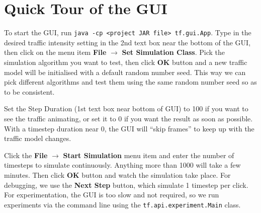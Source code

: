 \section{Quick Tour of the GUI}

To start the GUI, run \verb/java -cp <project JAR file> tf.gui.App/.
Type in the desired traffic intensity setting in the 2nd text box
near the bottom of the GUI, then click on the menu item
\textbf{File} $\rightarrow$ \textbf{Set Simulation Class}. Pick the simulation
algorithm you want to test,
then click \textbf{OK} button and a new traffic model will be
initialised with a default random number seed. This way we can
pick different algorithms and test them using the same random
number seed so as to be consistent.

Set the Step Duration (1st text box near bottom of GUI) to 100
if you want to see the traffic animating, or set it to 0 if
you want the result as soon as possible. With a timestep
duration near 0, the GUI will ``skip frames'' to keep up with
the traffic model changes.

Click the \textbf{File} $\rightarrow$ \textbf{Start Simulation} menu item
and enter the number of timesteps to simulate continuously. Anything
more than 1000 will take a few minutes. Then click \textbf{OK}
button and watch the simulation take place. For debugging,
we use the \textbf{Next Step} button, which simulate 1 timestep
per click. For experimentation, the GUI is too slow and not
required, so we run experiments via the command line using
the \verb/tf.api.experiment.Main/ class.